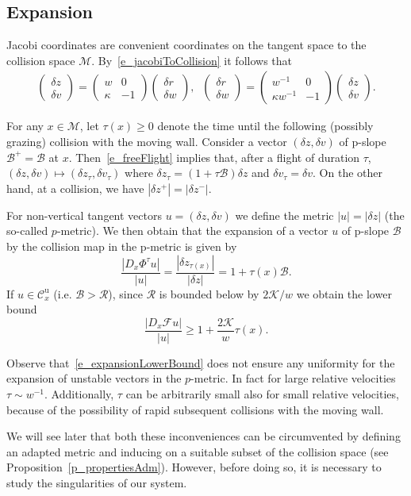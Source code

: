 \documentclass[AHL, Unicode, longabstracts,published]{cedram}
\newcommand{\ct}{r}
\newcommand{\fft}{\tau}
\newcommand{\curv}{\kappa}
\newcommand{\inv}{^{-1}}
\newcommand{\unstable}{\text{u}}
\newcommand{\cK}{\mathcal{K}}
\newcommand{\cpar}{\mathcal{R}}
\newcommand{\pslope}{\mathcal{B}}
\newcommand{\cm}{\mathcal{F}}
\newcommand{\csp}{\mathcal{M}}
\newcommand{\cone}{\mathcal{C}}
\newcommand{\matrixtt}[4]{\left(
\begin{array}{cc}#1&#2\\#3&#4
\end{array}\right)}
\newcommand{\vectt}[2]{\left(
\begin{array}{c}#1\\#2
\end{array}\right)}
\newcommand{\coneu}{\cone^\unstable}
\newcommand{\ppPrivate}[2]{#1^{#2}}
\newcommand{\prePrivate}[1]{\ppPrivate{#1}{-}}
\newcommand{\postPrivate}[1]{\ppPrivate{#1}{+}}
\newcommand{\prz}{\prePrivate{z}}
\newcommand{\poz}{\postPrivate{z}}
\begin{document}
\subsection{Expansion}\label{s_Jacobian}
Jacobi coordinates are convenient coordinates on the tangent space to the collision space $\csp$. By~\eqref{e_jacobiToCollision} it follows that
\begin{align*}
\vectt{\delta z}{\delta v}=\matrixtt{w}{0}{\curv}{-1}\vectt{\delta\ct}{\delta w}, \;\;
\vectt{\delta\ct}{\delta w}=\matrixtt{w\inv}{0}{\curv w\inv}{-1}\vectt{\delta z}{\delta v}.
\end{align*}

For any $x\in\csp$, let $\fft(x)\ge 0$ denote the time until the following (possibly grazing) collision with the moving wall. Consider a vector $(\delta z,\delta v)$ of p-slope $\pslope^{+} = \pslope$ at $x$. Then~\eqref{e_freeFlight} implies that, after a flight of duration $\fft$, $(\delta z,\delta v)\mapsto(\delta z_{\fft},\delta v_{\fft})$ where $\delta z_\fft=(1+\fft\pslope)\delta z$ and $\delta v_\fft = \delta v$. On the other hand, at a collision, we have $|\delta \poz|=|\delta\prz|$.

For non-vertical tangent vectors $u = (\delta z,\delta v)$ we define the metric $|u| = |\delta z|$ (the so-called $p$-metric). We then obtain that the expansion of a vector $u$ of p-slope $\pslope$ by the collision map in the p-metric is given by
\begin{equation}\label{ExpPMetric}
\frac{| D_{x}\Phi^{\fft} u|}{|u|} =
\frac{|\delta z_{\fft(x)}|}{|\delta z|}=1+\fft(x)\pslope.
\end{equation}
If $u\in\coneu_{x}$ (i.e. $\pslope>\cpar$), since $\cpar$ is bounded below by $2\cK/w$ we obtain the lower bound
\begin{equation}\label{e_expansionLowerBound}
\frac{|D_{x}\cm u|}{|u|}\geq 1+\frac{2\cK}{w}\fft(x).
\end{equation}

\begin{rema}\label{r_needForAlpha}
Observe that~\eqref{e_expansionLowerBound} does not ensure any uniformity for the expansion of unstable vectors in the $p$-metric. In fact for large relative velocities $\fft\sim w\inv$. Additionally, $\fft$ can be arbitrarily small also for small relative velocities, because of the possibility of rapid subsequent collisions with the moving wall.

We will see later that both these inconveniences can be circumvented by defining an adapted metric and inducing on a suitable subset of the collision space (see Proposition~\ref{p_propertiesAdm}). However, before doing so, it is necessary to study the singularities of our system.
\end{rema}
\end{document}
